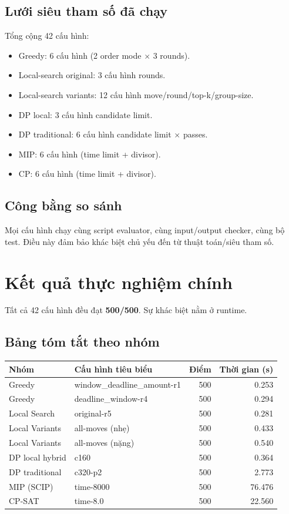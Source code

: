 \documentclass[12pt,a4paper]{article}
\begin{document}
\subsection{Lưới siêu tham số đã chạy}
Tổng cộng 42 cấu hình:
\begin{itemize}
  \item Greedy: 6 cấu hình (2 order mode $\times$ 3 rounds).
  \item Local-search original: 3 cấu hình rounds.
  \item Local-search variants: 12 cấu hình move/round/top-k/group-size.
  \item DP local: 3 cấu hình candidate limit.
  \item DP traditional: 6 cấu hình candidate limit $\times$ passes.
  \item MIP: 6 cấu hình (time limit + divisor).
  \item CP: 6 cấu hình (time limit + divisor).
\end{itemize}

\subsection{Công bằng so sánh}
Mọi cấu hình chạy cùng script evaluator, cùng input/output checker, cùng bộ test. Điều này đảm bảo khác biệt chủ yếu đến từ thuật toán/siêu tham số.

\section{Kết quả thực nghiệm chính}
Tất cả 42 cấu hình đều đạt \textbf{500/500}. Sự khác biệt nằm ở runtime.

\subsection{Bảng tóm tắt theo nhóm}
\begin{longtable}{>{\raggedright\arraybackslash}p{3.2cm} >{\raggedright\arraybackslash}p{5.8cm} r r}
\toprule
Nhóm & Cấu hình tiêu biểu & Điểm & Thời gian (s)\\
\midrule
\endhead
Greedy & window\_deadline\_amount-r1 & 500 & 0.253 \\
Greedy & deadline\_window-r4 & 500 & 0.294 \\
Local Search & original-r5 & 500 & 0.281 \\
Local Variants & all-moves (nhẹ) & 500 & 0.433 \\
Local Variants & all-moves (nặng) & 500 & 0.540 \\
DP local hybrid & c160 & 500 & 0.364 \\
DP traditional & c320-p2 & 500 & 2.773 \\
MIP (SCIP) & time-8000 & 500 & 76.476 \\
CP-SAT & time-8.0 & 500 & 22.560 \\
\bottomrule
\end{longtable}
\end{document}
